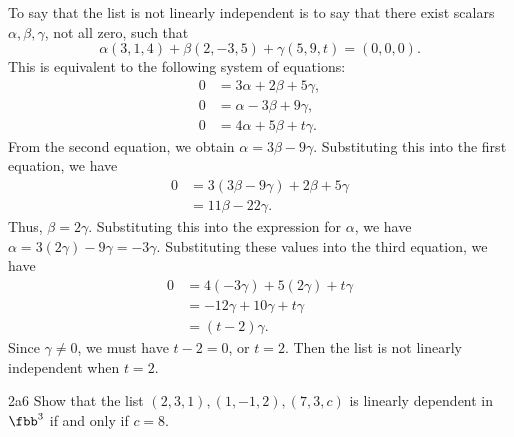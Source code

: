\begin{sol}
    To say that the list is not linearly independent is to say that there exist scalars $\alpha, \beta, \gamma$, not all zero, such that
    \[
    	\alpha(3, 1, 4) + \beta(2, -3, 5) + \gamma(5, 9, t) = (0, 0, 0).
    \]
    This is equivalent to the following system of equations:
    \begin{align*}
        0 & = 3\alpha + 2\beta + 5\gamma, \\
        0 & = \alpha - 3\beta + 9\gamma, \\
        0 & = 4\alpha + 5\beta + t\gamma.
    \end{align*}
    From the second equation, we obtain $\alpha = 3\beta - 9\gamma$.
	Substituting this into the first equation, we have
    \begin{align*}
        0 & = 3(3\beta - 9\gamma) + 2\beta + 5\gamma \\
        & = 11\beta - 22\gamma.
    \end{align*}
    Thus, $\beta = 2\gamma$.
	Substituting this into the expression for $\alpha$, we have $\alpha = 3(2\gamma) - 9\gamma = -3\gamma$.
	Substituting these values into the third equation, we have
    \begin{align*}
        0 & = 4(-3\gamma) + 5(2\gamma) + t\gamma \\
        & = -12\gamma + 10\gamma + t\gamma \\
        & = (t - 2)\gamma.
    \end{align*}
    Since $\gamma \neq 0$, we must have $t - 2 = 0$, or $t = 2$.
	Then the list is not linearly independent when $t = 2$.
\end{sol}
 
\begin{exercise}{2a6}
    Show that the list $(2, 3, 1), (1, -1, 2), (7, 3, c)$ is linearly dependent in $\fbb^3$ if and only if $c = 8$.
\end{exercise}

